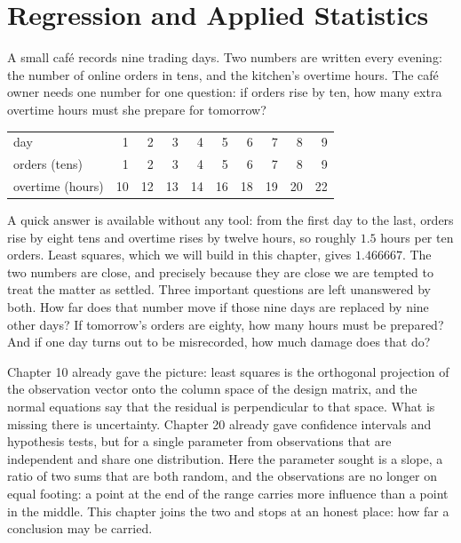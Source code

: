 \chapter{Regression and Applied Statistics}

A small café records nine trading days. Two numbers are written every evening: the number of
online orders in tens, and the kitchen's overtime hours. The café owner needs one number for
one question: if orders rise by ten, how many extra overtime hours must she prepare for
tomorrow?

\begin{center}
\small
\begin{tabular}{l*{9}{r}}
\hline
day                & 1 & 2 & 3 & 4 & 5 & 6 & 7 & 8 & 9 \\
orders (tens)      & 1 & 2 & 3 & 4 & 5 & 6 & 7 & 8 & 9 \\
overtime (hours)   & 10 & 12 & 13 & 14 & 16 & 18 & 19 & 20 & 22 \\
\hline
\end{tabular}
\end{center}

A quick answer is available without any tool: from the first day to the last, orders rise by
eight tens and overtime rises by twelve hours, so roughly $1.5$ hours per ten orders. Least
squares, which we will build in this chapter, gives $1.466667$. The two numbers are close, and
precisely because they are close we are tempted to treat the matter as settled. Three
important questions are left unanswered by both. How far does that number move if those nine days
are replaced by nine other days? If tomorrow's orders are eighty, how many hours must be
prepared? And if one day turns out to be misrecorded, how much damage does that do?

Chapter 10 already gave the picture: least squares is the orthogonal projection of the
observation vector onto the column space of the design matrix, and the normal equations say
that the residual is perpendicular to that space. What is missing there is uncertainty.
Chapter 20 already gave confidence intervals and hypothesis tests, but for a single parameter
from observations that are independent and share one distribution. Here the parameter sought
is a slope, a ratio of two sums that are both random, and the observations are no longer on
equal footing: a point at the end of the range carries more influence than a point in the
middle. This chapter joins the two and stops at an honest place: how far a conclusion may be
carried.

